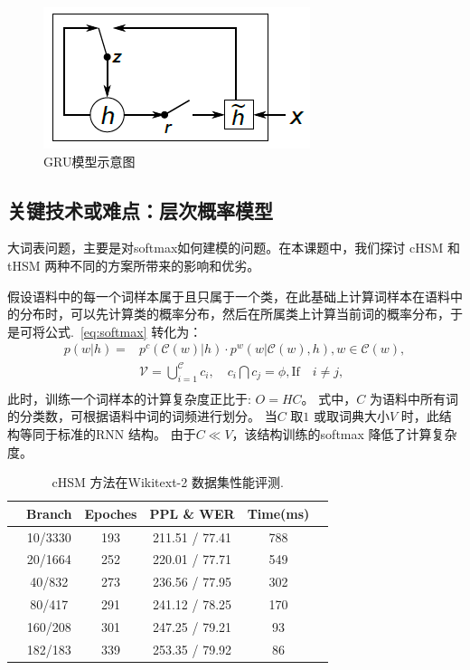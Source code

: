 \documentclass[master,openright,twoside,color]{buaathesis}
\begin{document}
\begin{figure}
  \centering
  \includegraphics[width=0.5\linewidth]{./figures/gru.png}
  \caption{GRU模型示意图}\label{fig:gru}
\end{figure}


\subsection{关键技术或难点：层次概率模型}
大词表问题，主要是对softmax如何建模的问题。在本课题中，我们探讨 cHSM 和 tHSM 两种不同的方案所带来的影响和优劣。

假设语料中的每一个词样本属于且只属于一个类，在此基础上计算词样本在语料中的分布时，可以先计算类的概率分布，然后在所属类上计算当前词的概率分布，于是可将公式.~\ref{eq:softmax} 转化为：
  \begin{equation}
  \begin{split}
p(w|h)=&p^c(\mathcal{C}(w)|h)\cdot p^w(w|\mathcal{C}(w),h) , w\in \mathcal{C}(w),\\
&\mathcal{V}=\bigcup _{i = 1}^\mathcal{C}{c_i},\quad  c_i \bigcap c_j=\phi, \text{If}\quad i\ne j, \\
\end{split}
\end{equation}
此时，训练一个词样本的计算复杂度正比于: $O =HC$。 式中，$C$ 为语料中所有词的分类数，可根据语料中词的词频进行划分。 当$C$ 取$1$ 或取词典大小$V$ 时，此结构等同于标准的RNN 结构。 由于$C \ll V$，该结构训练的softmax 降低了计算复杂度。

\begin{table}
  \centering
  \caption{cHSM 方法在Wikitext-2 数据集性能评测.\label{table:clustering}}
  \begin{tabular}{lccccc} \toprule
  &Branch& Epoches& PPL \& WER &Time(ms)\\\midrule
  &10/3330&193&211.51 / 77.41 &788\\
  &20/1664&252&220.01 / 77.71&549\\
  &40/832&273&236.56 / 77.95&302\\
  &80/417&291& 241.12 / 78.25&170\\
  &160/208&301&247.25 / 79.21&93\\
  &182/183&339&253.35 / 79.92&86\\
\bottomrule
\end{tabular}
\end{table}
\end{document}
